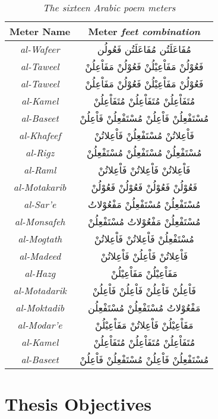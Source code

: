 \begin{table}[!t]
	\centering
	\begin{tabular}[h!]{|c|c|}
		\hline
		\textbf{Meter Name} & \textbf{Meter} \small{\textit{feet combination}} \\
		\hline
		\textit{al-Wafeer}    & \textarabic{مُفَاعَلَتُن مُفَاعَلَتُن فَعُولُن} \\ %
		\textit{al-Taweel}    & \textarabic{فَعُوْلُنْ مَفَاْعِيْلُنْ فَعُوْلُنْ مَفَاْعِلُنْ} \\ %
		\textit{al-Taweel}    & \textarabic{فَعُوْلُنْ مَفَاْعِيْلُنْ فَعُوْلُنْ مَفَاْعِلُنْ} \\ %
		\textit{al-Kamel}     & \textarabic{مُتَفَاْعِلُنْ مُتَفَاْعِلُنْ مُتَفَاْعِلُنْ} \\%
		\textit{al-Baseet}    & \textarabic{مُسْتَفْعِلُنْ فَاْعِلُنْ مُسْتَفْعِلُنْ فَاْعِلُنْ} \\%
		\textit{al-Khafeef}   & \textarabic{فَاْعِلاتُنْ مُسْتَفْعِلُنْ فَاْعِلاتُنْ} \\ %
		\textit{al-Rigz}      & \textarabic{مُسْتَفْعِلُنْ مُسْتَفْعِلُنْ مُسْتَفْعِلُنْ} \\%
		\textit{al-Raml}      & \textarabic{فَاْعِلاتُنْ فَاْعِلاتُنْ فَاْعِلاتُنْ} \\ %
		\textit{al-Motakarib} & \textarabic{فَعُوْلُنْ فَعُوْلُنْ فَعُوْلُنْ فَعُوْلُنْ} \\%
		\textit{al-Sar'e}     & \textarabic{مُسْتَفْعِلُنْ مُسْتَفْعِلُنْ مَفْعُوْلاتُ} \\%
		\textit{al-Monsafeh}  & \textarabic{مُسْتَفْعِلُنْ مَفْعُوْلاتُ مُسْتَفْعِلُنْ} \\
		\textit{al-Mogtath}   & \textarabic{مُسْتَفْعِلُنْ فَاْعِلاتُنْ فَاْعِلاتُنْ} \\
		\textit{al-Madeed}    & \textarabic{فَاْعِلاتُنْ فَاْعِلُنْ فَاْعِلاتُنْ } \\
		\textit{al-Hazg}      & \textarabic{مَفَاْعِيْلُنْ مَفَاْعِيْلُنْ} \\%
		\textit{al-Motadarik} & \textarabic{فَاْعِلُنْ فَاْعِلُنْ فَاْعِلُنْ فَاْعِلُنْ} \\%
		\textit{al-Moktadib}  & \textarabic{مَفْعُوْلاتُ مُسْتَفْعِلُنْ مُسْتَفْعِلُن} \\
		\textit{al-Modar'e}   & \textarabic{مَفَاْعِيْلُنْ فَاْعِلاتُنْ مَفَاْعِيْلُنْ} \\				
		\textit{al-Kamel}     & \textarabic{مُتَفَاْعِلُنْ مُتَفَاْعِلُنْ مُتَفَاْعِلُنْ} \\%
		\textit{al-Baseet}    & \textarabic{مُسْتَفْعِلُنْ فَاْعِلُنْ مُسْتَفْعِلُنْ فَاْعِلُنْ} \\%
		\hline
	\end{tabular}
	\caption{\textit{The sixteen Arabic poem meters}}\label{arud:meters}
\end{table}
\bigskip
\newpage

\section{Thesis Objectives}





%	
%	
%	



